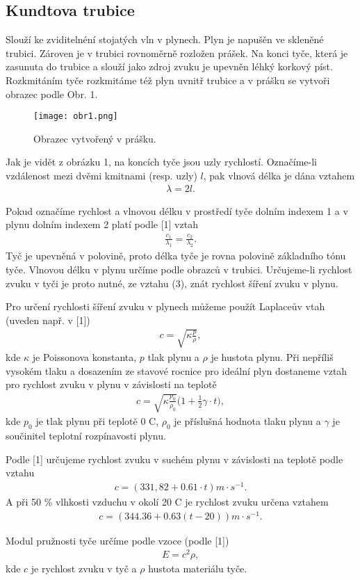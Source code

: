 \subsection{Kundtova trubice}
\par Slouží ke zviditelnéní stojatých vln v plynech. Plyn je napušěn ve skleněné trubici. Zároven je v trubici rovnoměrně rozložen prášek. Na konci tyče, která je zasunuta do trubice a slouží jako zdroj zvuku je upevněn léhký korkový píst. Rozkmitáním tyče rozkmitáme též plyn uvnitř trubice a v prášku se vytvoři obrazec podle Obr. 1.
\begin{figure}[h]
\centering
\texttt{[image: obr1.png]}
\caption{Obrazec vytvořený v prášku.}
\end{figure}
Jak je vidět z obrázku 1, na koncích tyče jsou uzly rychlostí. Označíme-li vzdálenost mezi dvěmi kmitnami (resp. uzly) $l$, pak vlnová délka je dána vztahem
\begin{align}
    \lambda = 2l.
\end{align}
\par  Pokud označíme rychlost a vlnovou délku v prostředí tyče dolním indexem 1 a v plynu dolním indexem 2 platí podle [1] vztah
\begin{align}
    \frac{c_1}{\lambda_1}= \frac{c_2}{\lambda_2}.
\end{align}
Tyč je upevněná v polovině, proto délka tyče je rovna polovině základního tónu tyče. Vlnovou délku v plynu určíme podle obrazců v trubici. Určujeme-li rychlost zvuku v tyči je proto nutné, ze vztahu (3), znát rychlost šíření zvuku v plynu.
\par Pro určení rychlosti šíření zvuku v plynech můžeme použít Laplaceův vtah (uveden např. v [1])
\begin{align}
    c = \sqrt{\kappa \frac{p}{\rho}},
\end{align}
kde $\kappa$ je Poissonova konstanta, $p$ tlak plynu a $\rho$ je hustota plynu. Při nepříliš vysokém tlaku a dosazením ze stavové rocnice pro ideální plyn dostaneme vztah pro rychlost zvuku v plynu v závislosti na teplotě
\begin{align}
    c = \sqrt{\kappa \frac{p_0}{\rho_0}}\big(1 + \frac{1}{2}\gamma \cdot t\big),
\end{align}
kde $p_0$ je tlak plynu při teplotě 0 \degree C, $\rho_0$ je příslušná hodnota tlaku plynu a $\gamma$ je součinitel teplotní rozpínavosti plynu.
\par Podle [1] určujeme rychlost zvuku v suchém plynu v závislosti na teplotě podle vztahu
\begin{align}
    c = (331,82 + 0.61 \cdot t) m \cdot s^{-1}.
\end{align}
A při 50 \% vlhkosti vzduchu v okolí 20 \degree C je rychlost zvuku určena vztahem
\begin{align}
    c = (344.36 + 0.63(t - 20)) m \cdot s^{-1}.
\end{align}
\par Modul pružnosti tyče určíme podle vzoce (podle [1])
\begin{align}
    E  = c^2 \rho,
\end{align}
kde $c$ je rychlost zvuku v tyč a $\rho$ hustota materiálu tyče.


